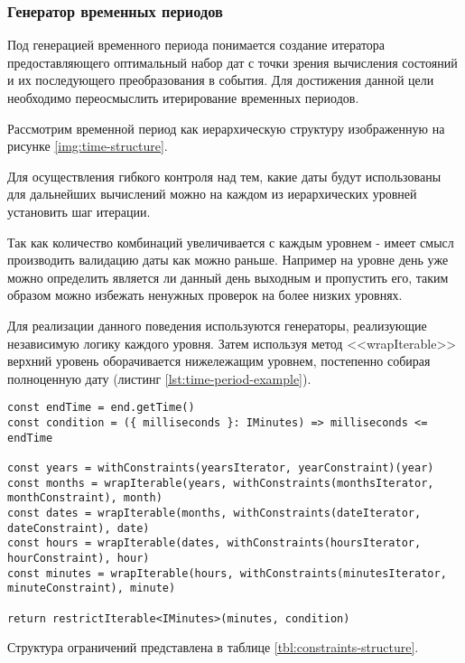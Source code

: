 \subsubsection{Генератор временных периодов}

Под генерацией временного периода понимается создание итератора предоставляющего оптимальный набор дат с точки зрения вычисления состояний и их последующего преобразования в события.
Для достижения данной цели необходимо переосмыслить итерирование временных периодов.

Рассмотрим временной период как иерархическую структуру изображенную на рисунке \ref{img:time-structure}.


Для осуществления гибкого контроля над тем, какие даты будут использованы для дальнейших вычислений можно на каждом из иерархических уровней установить шаг итерации.

Так как количество комбинаций увеличивается с каждым уровнем - имеет смысл производить валидацию даты как можно раньше.
Например на уровне день уже можно определить является ли данный день выходным и пропустить его, таким образом можно избежать ненужных проверок на более низких уровнях.

Для реализации данного поведения используются генераторы, реализующие независимую логику каждого уровня.
Затем используя метод <<wrapIterable>> верхний уровень оборачивается нижележащим уровнем, постепенно собирая полноценную дату (листинг \ref{lst:time-period-example}).

\begin{lstlisting}[caption={Процесс составления временного периода},label={lst:time-period-example}]
const endTime = end.getTime()
const condition = ({ milliseconds }: IMinutes) => milliseconds <= endTime

const years = withConstraints(yearsIterator, yearConstraint)(year)
const months = wrapIterable(years, withConstraints(monthsIterator, monthConstraint), month)
const dates = wrapIterable(months, withConstraints(dateIterator, dateConstraint), date)
const hours = wrapIterable(dates, withConstraints(hoursIterator, hourConstraint), hour)
const minutes = wrapIterable(hours, withConstraints(minutesIterator, minuteConstraint), minute)

return restrictIterable<IMinutes>(minutes, condition)
\end{lstlisting}

Структура ограничений представлена в таблице \ref{tbl:constraints-structure}.

